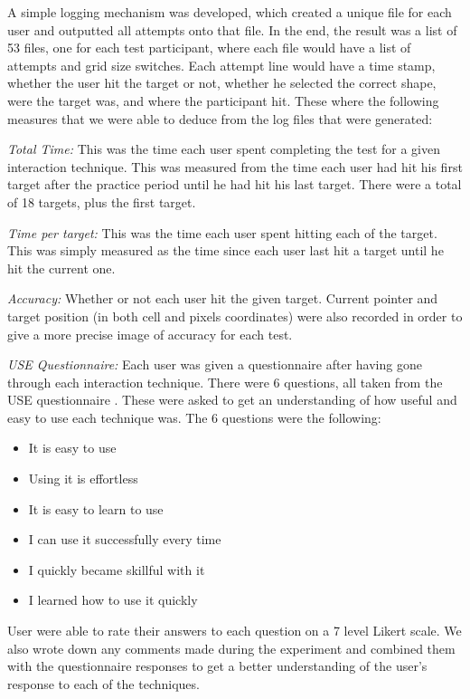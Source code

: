 A simple logging mechanism was developed, which created a unique file for each user and outputted all attempts onto that file. In the end, the result was a list of 53 files, one for each test participant, where each file would have a list of attempts and grid size switches. Each attempt line would have a time stamp, whether the user hit the target or not, whether he selected the correct shape, were the target was, and where the participant hit. These where the following measures that we were able to deduce from the log files that were generated: 

\textit{Total Time:} This was the time each user spent completing the test for a given interaction technique. 
This was measured from the time each user had hit his first target after the practice period until he had hit his last target. 
There were a total of 18 targets, plus the first target. 

\textit{Time per target:} This was the time each user spent hitting each of the target. 
This was simply measured as the time since each user last hit a target until he hit the current one.

\textit{Accuracy:} Whether or not each user hit the given target. 
Current pointer and target position (in both cell and pixels coordinates) were also recorded in order to give a more precise image of accuracy for each test. 

\textit{USE Questionnaire:} Each user was given a questionnaire after having gone through each interaction technique. 
There were 6 questions, all taken from the USE questionnaire \cite{lund2001measuring}. 
These were asked to get an understanding of how useful and easy to use each technique was. 
The 6 questions were the following: 

\begin{itemize}
	\item It is easy to use
	\item Using it is effortless
	\item It is easy to learn to use
	\item I can use it successfully every time
	\item I quickly became skillful with it
	\item I learned how to use it quickly
\end{itemize}

User were able to rate their answers to each question on a 7 level Likert scale. 
We also wrote down any comments made during the experiment and combined them with the questionnaire responses to get a better understanding of the user's response to each of the techniques. 

